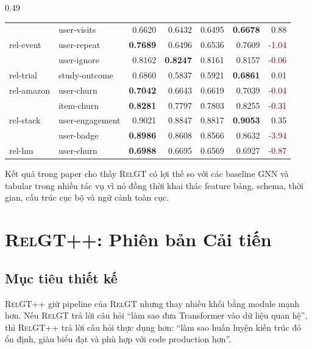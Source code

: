 \documentclass[12pt,a4paper]{article}
\newcommand{\RelGT}{\textsc{RelGT}}
\newcommand{\RelGTpp}{\textsc{RelGT++}}
\begin{document}
\begin{table}[H]
\begin{subtable}[t]{0.49\textwidth}
{\begin{tabular}{llrrrrr}
 & user-visits & 0.6620 & 0.6432 & 0.6495 & \textbf{0.6678} & 0.88 \\
rel-event & user-repeat & \textbf{0.7689} & 0.6496 & 0.6536 & 0.7609 & \textcolor{darkred}{-1.04} \\
 & user-ignore & 0.8162 & \textbf{0.8247} & 0.8161 & 0.8157 & \textcolor{darkred}{-0.06} \\
rel-trial & study-outcome & 0.6860 & 0.5837 & 0.5921 & \textbf{0.6861} & 0.01 \\
rel-amazon & user-churn & \textbf{0.7042} & 0.6643 & 0.6619 & 0.7039 & \textcolor{darkred}{-0.04} \\
 & item-churn & \textbf{0.8281} & 0.7797 & 0.7803 & 0.8255 & \textcolor{darkred}{-0.31} \\
rel-stack & user-engagement & 0.9021 & 0.8847 & 0.8817 & \textbf{0.9053} & 0.35 \\
 & user-badge & \textbf{0.8986} & 0.8608 & 0.8566 & 0.8632 & \textcolor{darkred}{-3.94} \\
rel-hm & user-churn & \textbf{0.6988} & 0.6695 & 0.6569 & 0.6927 & \textcolor{darkred}{-0.87} \\
\bottomrule
\end{tabular}}
\end{subtable}
\end{table}

Kết quả trong paper cho thấy \RelGT{} có lợi thế so với các baseline GNN và
tabular trong nhiều tác vụ vì nó đồng thời khai thác feature bảng, schema,
thời gian, cấu trúc cục bộ và ngữ cảnh toàn cục.

\section{\RelGTpp{}: Phiên bản Cải tiến}

\subsection{Mục tiêu thiết kế}

\RelGTpp{} giữ pipeline của \RelGT{} nhưng thay nhiều khối bằng module mạnh
hơn. Nếu \RelGT{} trả lời câu hỏi ``làm sao đưa Transformer vào dữ liệu quan
hệ'', thì \RelGTpp{} trả lời câu hỏi thực dụng hơn: ``làm sao huấn luyện kiến
trúc đó ổn định, giàu biểu đạt và phù hợp với code production hơn''.
\end{document}
